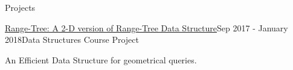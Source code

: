 \documentclass{resume} %
\begin{document}
\begin{rSection}{Projects}
		
		\begin{rSubsection}{\href{https://github.com/pouyaaghahoseini/DS-Course}{\textcolor{coolblack}{Range-Tree: A 2-D version of Range-Tree Data Structure}}}{Sep 2017 - January 2018}{Data Structures Course Project}{ }
			\item An Efficient Data Structure for geometrical queries.
		\end{rSubsection}
	\end{rSection}
\end{document}
